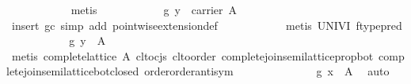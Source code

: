 \begin{isabellebody}
\ \ \ \ \ \ \ \ \ \ \isamarkupfalse%
\ metis\isanewline
\ \ \ \ \ \ \ \ \isamarkupfalse%
\ \isamarkupfalse%
\ {}g\ y\ {}\ carrier\ A{}\isanewline
\ \ \ \ \ \ \ \ \ \ \isamarkupfalse%
\ {}insert\ gc{}\ simp\ add{}\ pointwise{}extension{}def{}\isanewline
\ \ \ \ \ \ \ \ \ \ \isamarkupfalse%
\ {}metis\ UNIV{}I\ ftype{}pred{}\isanewline
\ \ \ \ \ \ \ \ \isamarkupfalse%
\ \isamarkupfalse%
\ {}g\ y\ {}\ {}\isactrlbsub A\isanewline
\ \ \ \ \ \ \ \ \ \ \isamarkupfalse%
\ {}metis\ {}complete{}lattice\ A{}\ cl{}to{}cjs\ cl{}to{}order\ complete{}join{}semilattice{}prop{}bot\ complete{}join{}semilattice{}bot{}closed\ order{}order{}antisym{}\isanewline
\ \ \ \ \ \ \isamarkupfalse%
\isanewline
\ \ \ \ \ \ \isamarkupfalse%
\ {}g\ x\ {}\ {}\isactrlbsub A\ \isamarkupfalse%
\ auto\isanewline
\ \ \ \ \isamarkupfalse%
\isanewline
\ \ \isamarkupfalse%

\end{isabellebody}
